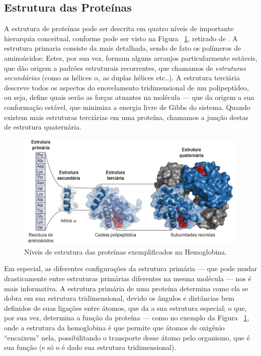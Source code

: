 \documentclass[a4paper,12pt]{article}
\begin{document}
	\subsection{Estrutura das Proteínas}
	A estrutura de proteínas pode ser descrita em quatro níveis de importante hierarquia conceitual, conforme pode ser visto na Figura ~\ref{fig:protest}, retirado de \cite{bioquimicaLehninger}. A estrutura primaria consiste da mais detalhada, sendo de fato os polímeros de aminoácidos; Estes, por sua vez, formam alguns arranjos particularmente estáveis, que dão origem a padrões estruturais recorrentes, que chamamos de \textit{estruturas secundárias} (como as hélices $\alpha$, as duplas hélices etc..). A estrutura terciária descreve todos os aspectos do enovelamento tridimensional de um polipeptídeo, ou seja, define quais serão as forças atuantes na molécula --- que da origem a sua conformação estável, que minimiza a energia livre de Gibbs do sistema. Quando existem mais estruturas terciárias em uma proteína, chamamos a junção destas de estrutura quaternária.	
	
	\begin{figure}[H]
		\begin{center}
			\includegraphics[width=0.9\linewidth]{protest.png}
		\end{center}
		\caption{Níveis de estrutura das proteínas exemplificados na Hemoglobina.}
		\label{fig:protest}
	\end{figure}
	
	Em especial, as diferentes configurações da estrutura primária --- que pode mudar drasticamente entre estruturas primárias diferentes na mesma molécula --- nos é mais informativa. A estrutura primária de uma proteína determina como ela se dobra em sua estrutura tridimensional, devido os ângulos e distâncias bem definidos de suas ligações entre átomos, que da a sua estrutura especial; o que, por sua vez, determina a função da proteína --- como no exemplo da Figura ~\ref{fig:protest}, onde a estrutura da hemoglobina é que permite que átomos de oxigênio ``encaixem'' nela, possibilitando o transporte desse átomo pelo organismo, que é sua função (e só o é dado sua estrutura tridimensional). 
	
\end{document}
